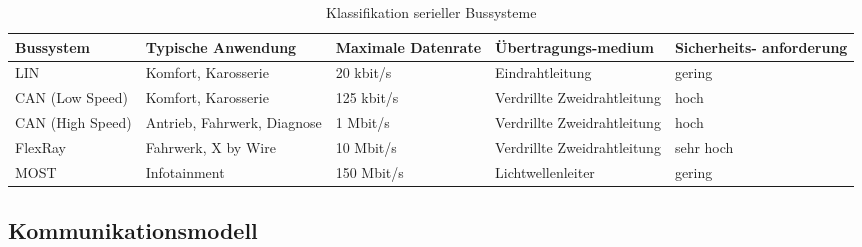 \begin{table}[!htbp]
	\centering
	\caption{Klassifikation serieller Bussysteme}
	\renewcommand{\arraystretch}{1.3}
	\begin{tabular}{p{2.5cm} p{3cm} p{2cm} p{3cm} p{2cm}}
		\toprule
		Bussystem                 & Typische \newline Anwendung                   & Maximale \newline Datenrate & Übertragungs-\newline medium         & Sicherheits- \newline anforderung \\ \midrule
		LIN                       & Komfort, \newline Karosserie                  & 20 kbit/s                   & Eindrahtleitung                      & gering                            \\
		CAN \newline (Low Speed)  & Komfort, \newline Karosserie                  & 125 kbit/s                  & Verdrillte \newline Zweidrahtleitung & hoch                              \\
		CAN \newline (High Speed) & Antrieb, \newline Fahrwerk, \newline Diagnose & 1 Mbit/s                    & Verdrillte \newline Zweidrahtleitung & hoch                              \\
		FlexRay                   & Fahrwerk, \newline X by Wire                  & 10 Mbit/s                   & Verdrillte \newline Zweidrahtleitung & sehr hoch                         \\
		MOST                      & Infotainment                                  & 150 Mbit/s                  & Lichtwellenleiter                    & gering                            \\ \bottomrule
	\end{tabular}
	
	\label{tab:KlassifikationSerielleBussysteme}
\end{table}





\subsection{Kommunikationsmodell} \label{subsec:Kommunikationsmodell}
\lipsum[1-1]
